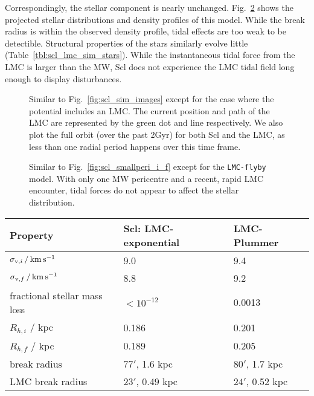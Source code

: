 Correspondingly, the stellar component is nearly unchanged.
Fig.~\ref{fig:scl_lmc_i_f} shows the projected stellar distributions and
density profiles of this model. While the break radius is within the
observed density profile, tidal effects are too weak to be detectible.
Structural properties of the stars similarly evolve little
(Table~\ref{tbl:scl_lmc_sim_stars}). While the instantaneous tidal force
from the LMC is larger than the MW, Scl does not experience the LMC
tidal field long enough to display disturbances.

\begin{figure}
\centering
{}
\caption[Sculptor simulation snapshots with LMC]{Similar to
Fig.~\ref{fig:scl_sim_images} except for the case where the potential
includes an LMC. The current position and path of the LMC are
represented by the green dot and line respectively. We also plot the
full orbit (over the past 2Gyr) for both Scl and the LMC, as less than
one radial period happens over this time
frame.}\label{fig:scl_lmc_sim_images}
\end{figure}

\begin{figure}
\centering
{}
\caption[Sculptor initial and final density with LMC]{Similar to
Fig.~\ref{fig:scl_smallperi_i_f} except for the \texttt{LMC-flyby}
model. With only one MW pericentre and a recent, rapid LMC encounter,
tidal forces do not appear to affect the stellar
distribution.}\label{fig:scl_lmc_i_f}
\end{figure}

\begin{table*}[t]
\centering
\caption[Simulation results for Sculptor’s stars in the LMC+MW potential]{Similar to Table \ref{tbl:scl_sim_stars_results}, but for the properties of the stellar components of the \texttt{LMC-flyby} model of Sculptor. }
\label{tbl:scl_lmc_sim_stars}
\begin{tabular}{lll}
\toprule
Property & Scl: LMC-exponential & LMC-Plummer\\
\midrule
$\sigma_{{\rm v}, i}\,/\,{\rm km\,s^{-1}}$ & 9.0 & 9.4\\
$\sigma_{{\rm v}, f} \,/\,{\rm km\,s^{-1}}$ & 8.8 & 9.2\\
fractional stellar mass loss & $<10^{-12}$ & 0.0013\\
$R_{h, i}$ / kpc & 0.186 & 0.201\\
$R_{h, f}$ / kpc & 0.189 & 0.205\\
break radius & $77'$, 1.6 kpc & $80'$, 1.7 kpc\\
LMC break radius & $23'$, 0.49 kpc & $24'$, 0.52 kpc\\
\bottomrule
\end{tabular}
\end{table*}

